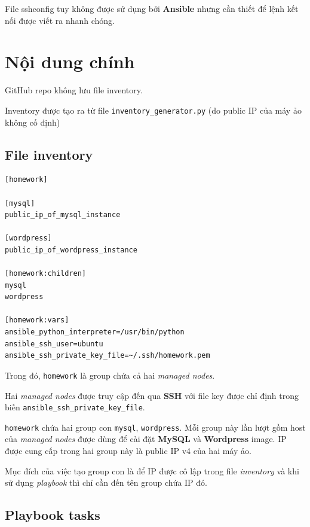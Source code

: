 \documentclass{article}
\begin{document}
\par File sshconfig tuy không được sử dụng bởi \textbf{Ansible} nhưng cần thiết để lệnh kết nối được viết ra nhanh chóng.

\section{Nội dung chính}

\par GitHub repo không lưu file inventory.

\par Inventory được tạo ra từ file \texttt{inventory\_generator.py} (do public IP của máy ảo không cố định)

\subsection{File inventory}
\begin{verbatim}
[homework]

[mysql]
public_ip_of_mysql_instance

[wordpress]
public_ip_of_wordpress_instance

[homework:children]
mysql
wordpress

[homework:vars]
ansible_python_interpreter=/usr/bin/python
ansible_ssh_user=ubuntu
ansible_ssh_private_key_file=~/.ssh/homework.pem
\end{verbatim}

\par Trong đó, \texttt{homework} là group chứa cả hai \textit{managed nodes}.

\par Hai \textit{managed nodes} được truy cập đến qua \textbf{SSH} với file key được chỉ định trong biến \texttt{ansible\_ssh\_private\_key\_file}.

\par \texttt{homework} chứa hai group con \texttt{mysql}, \texttt{wordpress}. Mỗi group này lần lượt gồm host của \textit{managed nodes}  được dùng để cài đặt \textbf{MySQL} và \textbf{Wordpress} image. IP được cung cấp trong hai group này là public IP v4 của hai máy ảo.

\par Mục đích của việc tạo group con là để IP được cô lập trong file \textit{inventory} và khi sử dụng \textit{playbook} thì chỉ cần đến tên group chứa IP đó.

\subsection{Playbook tasks}
\end{document}
